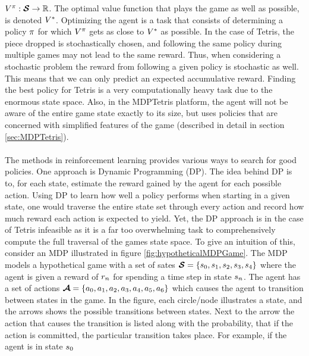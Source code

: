 $V^{\pi} : \boldsymbol{\mathcal{S}} \rightarrow \mathbb{R}$. 
The optimal value function that plays the game as well
as possible, is denoted $V^{*}$. Optimizing the 
agent is a task that consists of determining a policy $\pi$ for which
$V^{\pi}$ gets as close to $V^{*}$
as possible. In the case of Tetris, the piece dropped is stochastically 
chosen, and following the same policy during multiple games may not lead to the 
same reward. Thus, when considering a stochastic problem the reward 
from following a given policy is stochastic as well. This means that 
we can only predict an expected accumulative reward.
Finding the best policy for Tetris is a very computationally heavy 
task due to the enormous state space. Also, in the MDPTetris platform,
the agent will not be aware of the entire game state exactly to its 
size, but uses policies that are concerned with simplified
features of the game (described in detail in section \ref{sec:MDPTetris}).\\
\\
The methods in reinforcement learning provides various ways to
search for good policies.
One approach is 
Dynamic Programming (DP). The idea behind DP is to, for each state,
estimate the reward gained by the agent for each possible action.
Using DP to learn how well a policy performs when starting in a 
given state, one would traverse the entire state set through every
action and record how much reward each action is expected to 
yield.
Yet, the DP approach is in the case of Tetris infeasible as it 
is a far too overwhelming task to comprehensively compute
the full traversal of the games state space. 
To give an intuition of this, consider
an MDP illustrated in figure \ref{fig:hypotheticalMDPGame}.
The MDP models a hypothetical game with a set of sates 
$\boldsymbol{\mathcal{S}} = \{s_0, s_1, s_2, s_3,
s_4\}$ where the agent is given a reward of $r_n$
for spending a time step in state $s_n$. The agent has a 
set of actions $\boldsymbol{\mathcal{A}} = \{a_0, a_1, 
a_2, a_3, a_4, 
a_5, a_6\}$ which causes the agent to transition 
between states in the game. In the figure, each circle/node illustrates a 
state, and the arrows shows the possible transitions between states.
Next to the arrow the action that causes the transition is listed 
along with the probability, that if the action is committed, the particular 
transition takes place. For example, if the agent is in state $s_0$
